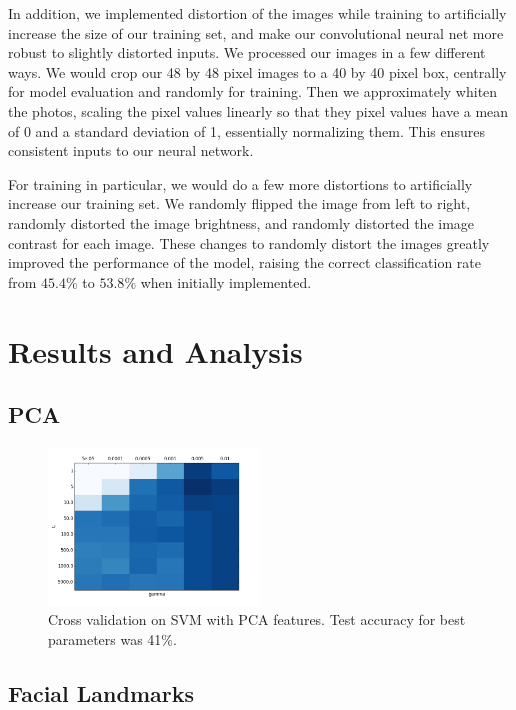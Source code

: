 \documentclass[11pt, twocolumn, twoside]{article}
\begin{document}
In addition, we implemented distortion of the images while training to artificially increase the size of our training set, and make our convolutional neural net more robust to slightly distorted inputs. We processed our images in a few different ways. We would crop our 48 by 48 pixel images to a 40 by 40 pixel box, centrally for model evaluation and randomly for training. Then we approximately whiten the photos, scaling the pixel values linearly so that they pixel values have a mean of 0 and a standard deviation of 1, essentially normalizing them. This ensures consistent inputs to our neural network.

For training in particular, we would do a few more distortions to artificially increase our training set. We randomly flipped the image from left to right, randomly distorted the image brightness, and 	randomly distorted the image contrast for each image. These changes to randomly distort the images greatly improved the performance of the model, raising the correct classification rate from $45.4\%$ to $53.8\%$ when initially implemented.

\section{Results and Analysis}

\subsection{PCA}

\begin{figure}
\centering
\includegraphics[width=0.5\textwidth]{grid_search_pca}
\caption{\label{fig:grid_pca} Cross validation on SVM with PCA features. Test accuracy for best
parameters was 41\%.}
\end{figure}

\subsection{Facial Landmarks}
\end{document}
